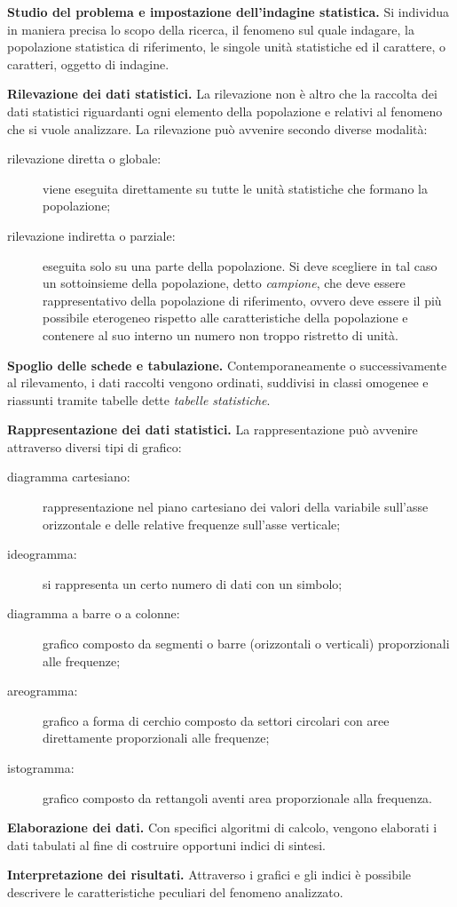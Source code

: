 \begin{enumeratea}
\item \textbf{Studio del problema e impostazione dell'indagine statistica.}
Si individua in maniera precisa lo scopo della ricerca, il fenomeno sul quale indagare, la popolazione statistica di riferimento,
le singole unità statistiche ed il carattere, o caratteri, oggetto di indagine.
\item \textbf{Rilevazione dei dati statistici.}
La rilevazione non è altro che la raccolta dei dati statistici riguardanti ogni elemento della popolazione e relativi al fenomeno che si vuole analizzare.
La rilevazione può avvenire secondo diverse modalità:
\begin{description}
\item [rilevazione diretta o globale:] viene eseguita direttamente su tutte le unità statistiche che formano la popolazione;
\item [rilevazione indiretta o parziale:] eseguita solo su una parte della popolazione. Si deve scegliere in tal caso un sottoinsieme della popolazione,
detto \emph{campione}, che deve essere rappresentativo della popolazione di riferimento, ovvero deve essere il più possibile eterogeneo rispetto alle caratteristiche della popolazione e contenere al suo interno un numero non troppo ristretto di unità.
\end{description}
\item \textbf{Spoglio delle schede e tabulazione.}
Contemporaneamente o successivamente al rilevamento, i dati raccolti vengono ordinati, suddivisi in classi omogenee e riassunti tramite tabelle dette \emph{tabelle statistiche}.
\item \textbf{Rappresentazione dei dati statistici.}
La rappresentazione può avvenire attraverso diversi tipi di grafico:
\begin{description}
\item [diagramma cartesiano:] rappresentazione nel piano cartesiano dei valori della variabile 	sull'asse orizzontale e delle relative frequenze sull'asse verticale;
\item [ideogramma:] si rappresenta un certo numero di dati con un simbolo;
\item [diagramma a barre o a colonne:] grafico composto da segmenti o barre (orizzontali o verticali) proporzionali alle frequenze;
\item [areogramma:] grafico a forma di cerchio composto da settori circolari con aree direttamente proporzionali alle frequenze;
\item [istogramma:] grafico composto da rettangoli aventi area proporzionale alla frequenza.
\end{description}
\item \textbf{Elaborazione dei dati.}
Con specifici algoritmi di calcolo, vengono elaborati i dati tabulati al fine di costruire opportuni indici di sintesi.
\item \textbf{Interpretazione dei risultati.}
Attraverso i grafici e gli indici è possibile descrivere le caratteristiche peculiari del fenomeno analizzato.
\end{enumeratea}

